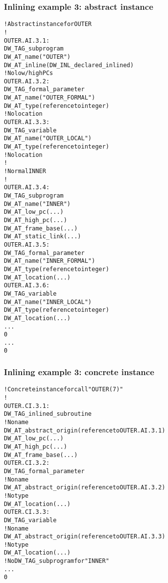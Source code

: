 \subsubsection{Inlining example 3: abstract instance}
\label{app:inliningexample3abstractinstance}
\begin{alltt}
    ! Abstract instance for OUTER
    !
OUTER.AI.3.1:
    DW\_TAG\_subprogram
        DW\_AT\_name("OUTER")
        DW\_AT\_inline(DW\_INL\_declared\_inlined)
        ! No low/high PCs
OUTER.AI.3.2:
        DW\_TAG\_formal\_parameter
            DW\_AT\_name("OUTER\_FORMAL")
            DW\_AT\_type(reference to integer)
            ! No location
OUTER.AI.3.3:
        DW\_TAG\_variable
            DW\_AT\_name("OUTER\_LOCAL")
            DW\_AT\_type(reference to integer)
            ! No location
        !
        ! Normal INNER
        !
OUTER.AI.3.4:
        DW\_TAG\_subprogram
            DW\_AT\_name("INNER")
            DW\_AT\_low\_pc(...)
            DW\_AT\_high\_pc(...)
            DW\_AT\_frame\_base(...)
            DW\_AT\_static\_link(...)
OUTER.AI.3.5:
            DW\_TAG\_formal\_parameter
                DW\_AT\_name("INNER\_FORMAL")
                DW\_AT\_type(reference to integer)
                DW\_AT\_location(...)
OUTER.AI.3.6:
            DW\_TAG\_variable
                DW\_AT\_name("INNER\_LOCAL")
                DW\_AT\_type(reference to integer)
                DW\_AT\_location(...)
            ...
            0
        ...
        0
\end{alltt}


\subsubsection{Inlining example 3: concrete instance}
\label{app:inliningexample3concreteinstance}
\begin{alltt}
    ! Concrete instance for call "OUTER(7)"
    !
OUTER.CI.3.1:
    DW\_TAG\_inlined\_subroutine
        ! No name
        DW\_AT\_abstract\_origin(reference to OUTER.AI.3.1)
        DW\_AT\_low\_pc(...)
        DW\_AT\_high\_pc(...)
        DW\_AT\_frame\_base(...)
OUTER.CI.3.2:
        DW\_TAG\_formal\_parameter
            ! No name
            DW\_AT\_abstract\_origin(reference to OUTER.AI.3.2)
            ! No type
            DW\_AT\_location(...)
OUTER.CI.3.3:
        DW\_TAG\_variable
            ! No name
            DW\_AT\_abstract\_origin(reference to OUTER.AI.3.3)
            ! No type
            DW\_AT\_location(...)
        ! No DW\_TAG\_subprogram for "INNER"
        ...
        0
\end{alltt}

